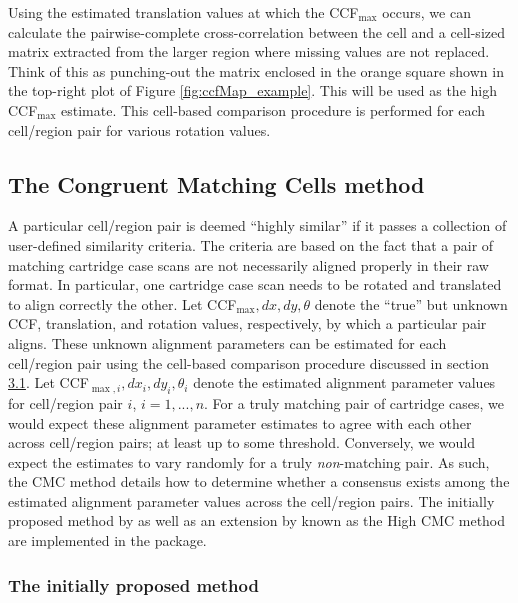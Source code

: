 Using the estimated translation values at which the CCF\(_{\max}\)
occurs, we can calculate the pairwise-complete cross-correlation between
the cell and a cell-sized matrix extracted from the larger region where
missing values are not replaced. Think of this as punching-out the
matrix enclosed in the orange square shown in the top-right plot of
Figure \ref{fig:ccfMap_example}. This will be used as the high
CCF\(_{\max}\) estimate. This cell-based comparison procedure is
performed for each cell/region pair for various rotation values.

\hypertarget{the-congruent-matching-cells-method}{%
\subsection{The Congruent Matching Cells
method}\label{the-congruent-matching-cells-method}}

A particular cell/region pair is deemed ``highly similar'' if it passes
a collection of user-defined similarity criteria. The criteria are based
on the fact that a pair of matching cartridge case scans are not
necessarily aligned properly in their raw format. In particular, one
cartridge case scan needs to be rotated and translated to align
correctly the other. Let CCF\(_{\max}, dx, dy, \theta\) denote the
``true'' but unknown CCF, translation, and rotation values,
respectively, by which a particular pair aligns. These unknown alignment
parameters can be estimated for each cell/region pair using the
cell-based comparison procedure discussed in section
\protect\hyperlink{comparisonProcedure}{3.1}. Let
CCF\(_{\max,i}, dx_i, dy_i, \theta_i\) denote the estimated alignment
parameter values for cell/region pair \(i\), \(i = 1,...,n\). For a
truly matching pair of cartridge cases, we would expect these alignment
parameter estimates to agree with each other across cell/region pairs;
at least up to some threshold. Conversely, we would expect the estimates
to vary randomly for a truly \emph{non}-matching pair. As such, the CMC
method details how to determine whether a consensus exists among the
estimated alignment parameter values across the cell/region pairs. The
initially proposed method by \citet{song_proposed_2013} as well as an
extension by \citet{tong_improved_2015} known as the High CMC method are
implemented in the  package.

\hypertarget{initialMethod}{%
\subsubsection{The initially proposed method}\label{initialMethod}}

